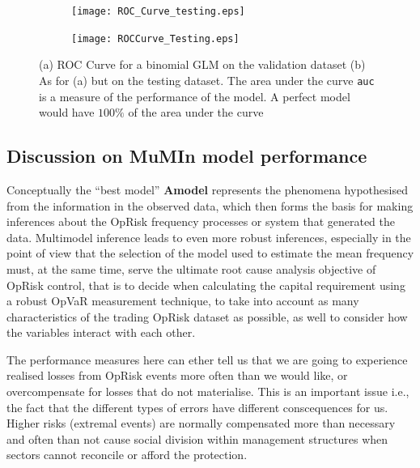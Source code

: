 \documentclass{DissertateUSU}
\begin{document}
\begin{figure}
\centering
\begin{subfigure}[b]{0.5\textwidth}
   \texttt{[image: ROC\_Curve\_testing.eps]}
   \caption{}
   \label{ROC_Validation_dataset} 
\end{subfigure}

\begin{subfigure}[b]{0.5\textwidth}
   \texttt{[image: ROCCurve\_Testing.eps]}
   \caption{}
   \label{ROC_Testing_dataset}
\end{subfigure}

\caption[ROC Curves for GLM over validation and testing set]{(a) ROC Curve for a binomial GLM on the validation dataset (b) As for (a) but on the testing dataset. The area under the curve \texttt{auc} is a measure of the performance of the model. A perfect model would have $100\%$ of the area under the curve}
\end{figure}

\singlespacing

\doublespacing

\subsection{Discussion on MuMIn model performance}
\label{ssec:Discussion on MuMIn model performance}

Conceptually the ``best model'' \textbf{Amodel} represents the phenomena
hypothesised from the information in the observed data, which then forms
the basis for making inferences about the OpRisk frequency processes or
system that generated the data. Multimodel inference leads to even more
robust inferences, especially in the point of view that the selection of
the model used to estimate the mean frequency must, at the same time,
serve the ultimate root cause analysis objective of OpRisk control, that
is to decide when calculating the capital requirement using a robust
OpVaR measurement technique, to take into account as many
characteristics of the trading OpRisk dataset as possible, as well to
consider how the variables interact with each other.\medskip

The performance measures here can ether tell us that we are going to
experience realised losses from OpRisk events more often than we would
like, or overcompensate for losses that do not materialise. This is an
important issue i.e., the fact that the different types of errors have
different conscequences for us. Higher risks (extremal events) are
normally compensated more than necessary and often than not cause social
division within management structures when sectors cannot reconcile or
afford the protection.
\end{document}
